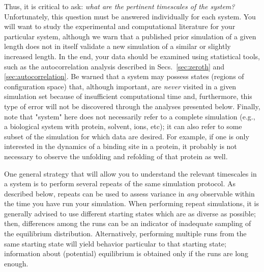 Thus, it is critical to ask: \emph{what are the pertinent timescales of the system?} 
Unfortunately, this question must be answered individually for each system.  You will want to study the experimental and computational literature for your particular system, although we warn that a published prior simulation of a given length does not in itself validate a new simulation of a similar or slightly increased length.  In the end, your data should be examined using statistical tools, such as the autocorrelation analysis described in Secs.~\ref{sec:zeroth} and \ref{sec:autocorrelation}.  Be warned that a system may possess states (regions of configuration space) that, although important, are \emph{never} visited in a given simulation set because of insufficient computational time \cite{Grossfield2009} and, furthermore, this type of error will not be discovered through the analyses presented below.
Finally, note that "system" here does not necessarily refer to a complete simulation (e.g., a biological system with protein, solvent, ions, etc); it can also refer to some subset of the simulation for which data are desired.  For example, if one is only interested in the dynamics of a binding site in a protein, it probably is not necessary to observe the unfolding and refolding of that protein as well.

One general strategy that will allow you to understand the relevant timescales in a system is to perform several repeats of the same simulation protocol.  As described below, repeats can be used to assess variance in \emph{any} observable within the time you have run your simulation.
When performing repeat simulations, it is generally advised to use different starting states which are as diverse as possible; then, differences among the runs can be an indicator of inadequate sampling of the equilibrium distribution.
Alternatively, performing multiple runs from the same starting state will yield behavior particular to that starting state; information about (potential) equilibrium is obtained only if the runs are long enough.

